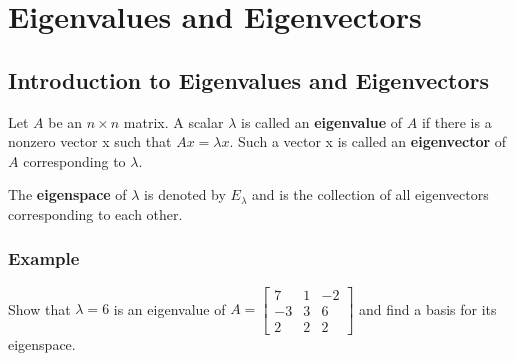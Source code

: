 \setcounter{chapter}{3}
\chapter{Eigenvalues and Eigenvectors}

\section{Introduction to Eigenvalues and Eigenvectors}
Let $A$ be an $n\times n$ matrix. A scalar $\lambda$ is called an \textbf{eigenvalue} of $A$ if there is a nonzero vector x such that $Ax = \lambda x$. Such a vector x is called an \textbf{eigenvector} of $A$ corresponding to $\lambda$.

The \textbf{eigenspace} of $\lambda$ is denoted by $E_\lambda$ and is the collection of all eigenvectors corresponding to each other.

\subsection*{Example}
Show that $\lambda = 6$ is an eigenvalue of $A = \begin{bmatrix}
    7&1&-2\\-3&3&6\\2&2&2
\end{bmatrix}$ and find a basis for its eigenspace. 
